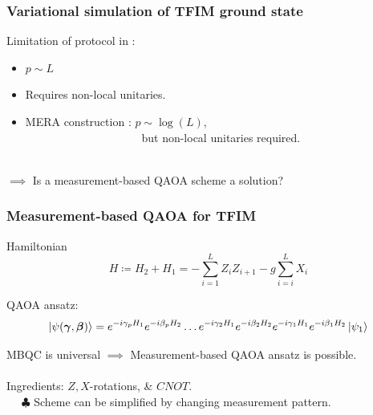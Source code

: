 \documentclass{beamer}
\theoremstyle{definition}
\begin{document}

\begin{frame}
\frametitle{Variational simulation of TFIM ground state}


Limitation of protocol in \cite{VQCS}: 
\begin{itemize}
	\item  $p \sim L$
	
	\item Requires non-local unitaries. 
	
	\item MERA construction \cite{MERA}: $p\sim \log(L)$, \\
	$\quad\quad\quad\quad\quad\quad\qquad\qquad$ but non-local unitaries required.
\end{itemize}

$\,$\\

$\implies$ Is a measurement-based QAOA scheme a solution?






\end{frame}








\begin{frame}
\frametitle{Measurement-based QAOA for TFIM}

Hamiltonian
\begin{equation*}
H \coloneqq H_2 + H_1 =  - \sum_{i=1}^L Z_i Z_{i+1} - g\sum^L_{i=i}X_i
\end{equation*}


QAOA ansatz:
\begin{equation*}
\left\vert{\psi(\bm{\gamma}, \bm{\beta})}\right\rangle =  \strut {e^{-i\gamma_p H_1}e^{-i\beta_p H_2}} \dots {e^{-i\gamma_2 H_1}e^{-i\beta_2 H_2}} {e^{-i\gamma_1 H_1}e^{-i\beta_1 H_2}} \left\vert{\psi_1}\right\rangle
\end{equation*}

MBQC is universal $\implies$ Measurement-based QAOA ansatz is possible. \\

$\,$\\

Ingredients: $Z,X$-rotations, \& $CNOT$. \\

$\quad$ $\clubsuit$ Scheme can be simplified by changing measurement pattern.  






\end{frame}
\end{document}
